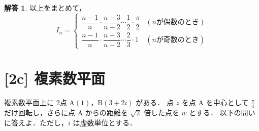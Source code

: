 \documentclass[dvipdfmx]{jlreq}
\theoremstyle{definition}
\newtheorem*{solution}{解答}
\begin{document}
\begin{enumerate}[label=(\arabic*)]
\begin{solution}
    以上をまとめて，
    \[
    I_n = \begin{cases}
    \dfrac{n-1}{n} \cdot \dfrac{n-3}{n-2} \cdots \dfrac{1}{2} \cdot \dfrac{\pi}{2} & (n \text{が偶数のとき}) \\[10pt]
    \dfrac{n-1}{n} \cdot \dfrac{n-3}{n-2} \cdots \dfrac{2}{3} \cdot 1 & (n \text{が奇数のとき})
    \end{cases}
    \]
    \end{solution}
\end{enumerate}

\newpage

\section*{[2c] 複素数平面}
複素数平面上に 2点 $\mathrm{A}(1)$，$\mathrm{B}(3+2i)$ がある．
点 $z$ を点 $\mathrm{A}$ を中心として $\frac{\pi}{4}$ だけ回転し，さらに点 $\mathrm{A}$ からの距離を $\sqrt{2}$ 倍した点を $w$ とする．
以下の問いに答えよ．ただし，$i$ は虚数単位とする．
\end{document}
